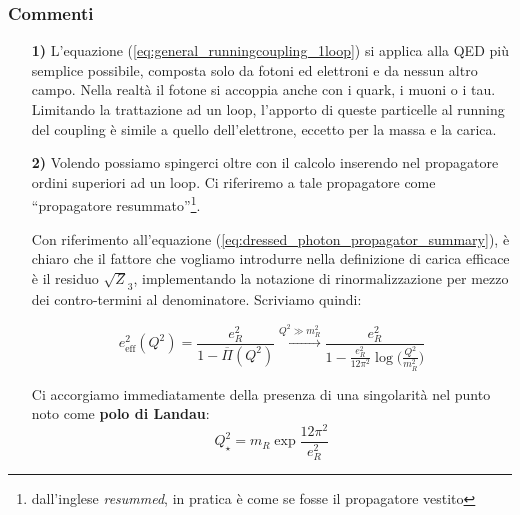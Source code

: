 \documentclass[../main.tex]{subfiles}
\begin{document}
\subsubsection{Commenti}
\begin{enumerate}
    \item[\textbf{1)}] L'equazione (\ref{eq:general_runningcoupling_1loop}) si applica alla QED più semplice possibile, composta solo da fotoni ed elettroni e da nessun altro campo. Nella realtà il fotone si accoppia anche con i quark, i muoni o i tau. Limitando la trattazione ad un loop, l'apporto di queste particelle al running del coupling è simile a quello dell'elettrone, eccetto per la massa e la carica.

     \item[\textbf{2)}] Volendo possiamo spingerci oltre con il calcolo inserendo nel propagatore ordini superiori ad un loop. Ci riferiremo a tale propagatore come “propagatore resummato”\footnote{dall'inglese \textit{resummed}, in pratica è come se fosse il propagatore vestito}.

     Con riferimento all'equazione (\ref{eq:dressed_photon_propagator_summary}), è chiaro che il fattore che vogliamo introdurre nella definizione di carica efficace è il residuo $\sqrt Z_3$, implementando la notazione di rinormalizzazione per mezzo dei contro-termini al denominatore. Scriviamo quindi:

    \begin{equation}
        e_\text{eff}^2(Q^2) = \frac{e_R^2}{1 - \overline\Pi(Q^2)} 
        \xrightarrow[]{Q^2\gg m_R^2}
        \frac{e_R^2}{ 1 - \frac{e_R^2}{12\pi^2}\log\bigg(\frac{Q^2}{m_R^2}\bigg)}
        \label{eq:general_runningcoupling_resummed}
    \end{equation}

    Ci accorgiamo immediatamente della presenza di una singolarità nel punto noto come \textbf{polo di Landau}:
    \begin{equation}
        Q_\star^2 = m_R\exp{\frac{12\pi^2}{e_R^2}}
        \label{eq:Landau_pole}
    \end{equation}


\end{enumerate}
\end{document}
